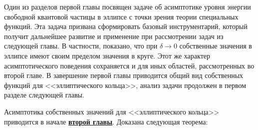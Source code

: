 Один из разделов первой главы посвящен задаче об асимптотике уровня энергии свободной квантовой частицы в эллипсе с точки зрения теории специальных функций. Эта задача призвана сформировать базовый инструментарий, который получит дальнейшее развитие и применение при рассмотрении задач из следующей главы. В частности, показано, что при $\delta \to0$ собственные значения в эллипсе имеют своим пределом значения в круге. Этот же характер асимптотического поведения сохраняется и для иных областей, рассмотренных во второй главе.
В завершение первой главы приводится общий вид собственных функций для <<эллиптического кольца>>, анализ задачи продолжен в первом разделе следующей главы.

Асимптотика собственных значений для <<эллиптического кольца>> приводится в начале \underline{\textbf{второй главы}}. 
Доказана следующая теорема:
\renewcommand{\thetheorem}{4}
